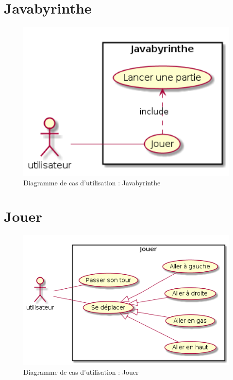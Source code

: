 \section{Javabyrinthe}

\begin{figure}[h!]%
\centering
	\includegraphics[width=15cm]{images/UML_casUtilisation_Javabyrinthe.png}%
	\caption{Diagramme de cas d'utilisation : Javabyrinthe}%
	\label{fig:useCase}%
\end{figure}
\newpage
\section{Jouer}
\begin{figure}[h!]%
\centering
	\includegraphics[width=15cm]{images/UML_casUtilisation_Jouer.png}%
	\caption{Diagramme de cas d'utilisation : Jouer}%
	\label{fig:useCase}%
\end{figure}

